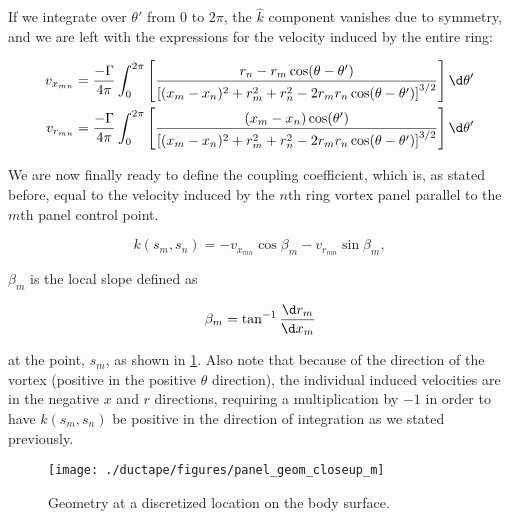 \noindent If we integrate over \(\theta'\) from 0 to \(2\pi\), the \(\hat{k}\) component vanishes due to symmetry, and we are left with the expressions for the velocity induced by the entire ring:

\begin{equation}
	\begin{aligned}
		v_{x_{mn}} &= \frac{-\Gamma}{4\pi} \int_0^{2\pi} \left[ \frac{r_n - r_m\cos(\theta - \theta')}{\left[(x_m-x_n)^2 + r_m^2 + r_n^2 - 2 r_m r_n \cos(\theta-\theta')\right]^{3/2}} \right]\d\theta' \\
		v_{r_{mn}} &= \frac{-\Gamma}{4\pi} \int_0^{2\pi} \left[ \frac{(x_m-x_n)\cos(\theta')}{\left[(x_m-x_n)^2 + r_m^2 + r_n^2 - 2 r_m r_n \cos(\theta-\theta')\right]^{3/2}} \right]\d\theta'
	\end{aligned}
\end{equation}


We are now finally ready to define the coupling coefficient, which is, as stated before, equal to the velocity induced by the \(n\)th ring vortex panel parallel to the \(m\)th panel control point.

\begin{equation}
	k(s_m, s_n)  = -v_{x_{mn}} \cos\beta_m - v_{r_{mn}} \sin\beta_m,
\end{equation}

\where \(\beta_m\) is the local slope defined as

\begin{equation}
	\beta_m = \tan^{-1} \frac{\d r_m}{\d x_m}
\end{equation}

\noindent at the point, \(s_m\), as shown in \cref{fig:panel_geom_closeup_m}.
Also note that because of the direction of the vortex (positive in the positive \(\theta\) direction), the individual induced velocities are in the negative \(x\) and \(r\) directions, requiring a multiplication by \(-1\) in order to have \(k(s_m,s_n)\) be positive in the direction of integration as we stated previously.


\begin{figure}[h!]
	\centering
	\texttt{[image: ./ductape/figures/panel\_geom\_closeup\_m]}
	\caption{Geometry at a discretized location on the body surface.}
	\label{fig:panel_geom_closeup_m}
\end{figure}


